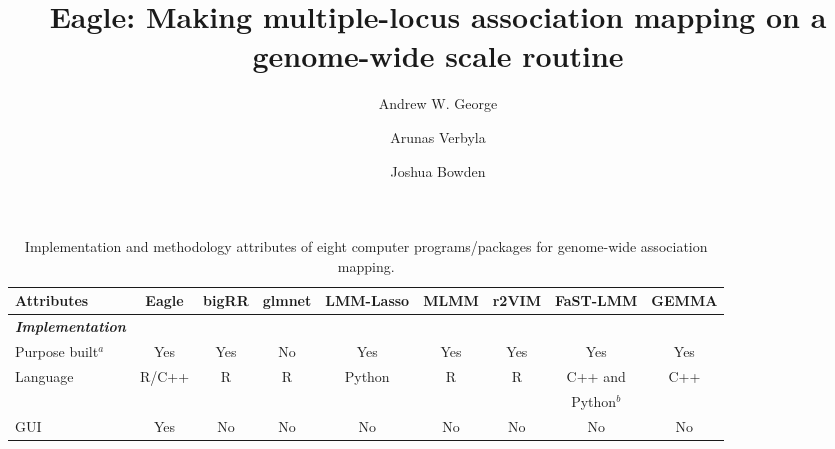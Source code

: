 \documentclass{article}
\begin{document}
\title{Eagle: Making multiple-locus association mapping on a genome-wide scale routine}
\author[1]{Andrew W. George}
\author[1]{Arunas Verbyla}
\author[2]{Joshua Bowden}


\maketitle






\begin{landscape}

\begin{table}
\caption{Implementation and methodology attributes of eight computer programs/packages for genome-wide association mapping.  }
\label{suptabsummary}
\vspace{0.5cm}
\begin{tabular}{lcccccccc} \hline
                                                   Attributes                  & {\bf Eagle}                                 & {\bf bigRR}             & {\bf glmnet}            & {\bf LMM-Lasso}                    & {\bf MLMM} & {\bf r2VIM}      & {\bf FaST-LMM} & {\bf GEMMA} \\  \hline
{\bf {\em Implementation}}    &         &            &             &                   &            &                &      &      \\ [0.15cm]
\hspace{1mm}  Purpose built$^a$    &   Yes     &    Yes      &  No   &   Yes  &  Yes  &  Yes  & Yes  & Yes          \\ [0.15cm]


\hspace{1mm}  Language                 &  R/C++       &    R        &      R       &     Python     &  R          &    R         &  C++ and     &   C++   \\  
                                                          &         &            &             &                   &            &                                     &   Python$^b$       &      \\  [0.15cm]

\hspace{1mm} GUI                            & Yes &    No      & No          &  No    &  No    &   No     & No     & No    \\  [0.15cm]





\end{tabular}
\end{table}
\end{landscape}
\end{document}
